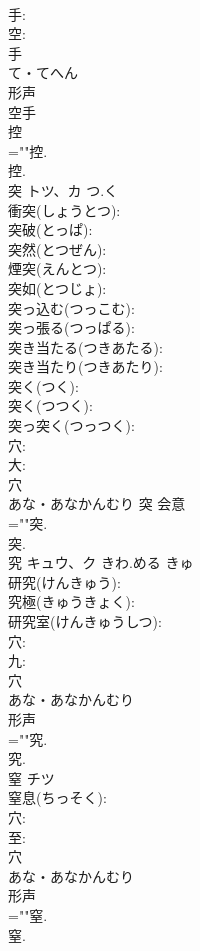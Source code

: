 \documentclass[8pt]{extreport}
\begin{document}
\begin{CJK}{UTF8}{min}
\\	手: 
\\	空: 
\\	手	
\\	て・てへん	
\\	形声 
\\	空手 
\\	控 
\\	=""控.
\\	控.
\\	突	トツ、カ	つ.く		
\\	衝突(しょうとつ): 
\\	突破(とっぱ): 
\\	突然(とつぜん): 
\\	煙突(えんとつ): 
\\	突如(とつじょ): 
\\	突っ込む(つっこむ): 
\\	突っ張る(つっぱる): 
\\	突き当たる(つきあたる): 
\\	突き当たり(つきあたり): 
\\	突く(つく): 
\\	突く(つつく): 
\\	突っ突く(つっつく): 
\\	穴: 
\\	大: 
\\	穴	
\\	あな・あなかんむり	突	会意 
\\	=""突.
\\	突.
\\	究	キュウ、ク	きわ.める	きゅ	
\\	研究(けんきゅう): 
\\	究極(きゅうきょく): 
\\	研究室(けんきゅうしつ): 
\\	穴: 
\\	九: 
\\	穴	
\\	あな・あなかんむり	
\\	形声 
\\	=""究.
\\	究.
\\	窒	チツ			
\\	窒息(ちっそく): 
\\	穴: 
\\	至: 
\\	穴	
\\	あな・あなかんむり	
\\	形声 
\\	=""窒.
\\	窒.

\end{CJK}
\end{document}
